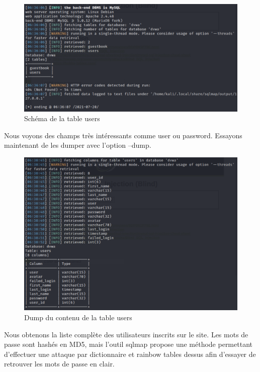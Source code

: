 \documentclass[12pt, oneside]{article}
\begin{document}
\begin{figure}[H]
\centering
\includegraphics[scale=0.4]{5}
\caption{Schéma de la table users}
\end{figure}

Nous voyons des champs très intéressants comme user ou password. Essayons maintenant de les dumper avec l'option --dump.

\begin{figure}[H]
\centering
\includegraphics[scale=0.4]{6}
\caption{Dump du contenu de la table users}
\end{figure}

Nous obtenons la liste complète des utilisateurs inscrits sur le site. Les mots de passe sont hashés en MD5, mais l'outil sqlmap propose une méthode permettant d'effectuer une attaque par dictionnaire et rainbow tables dessus afin d'essayer de retrouver les mots de passe en clair.
\end{document}
